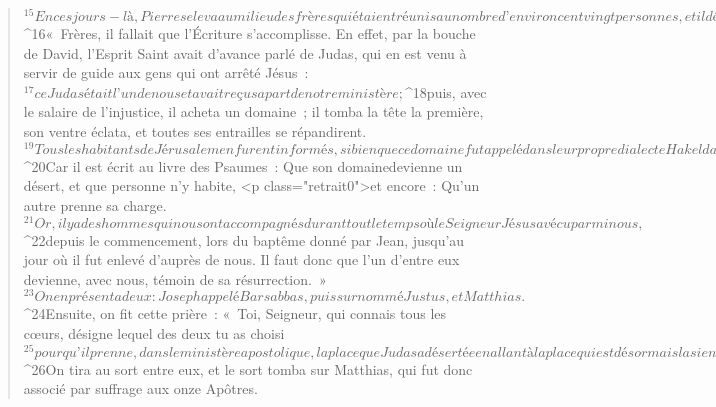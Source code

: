 \begin{verse}
${}^{15}En ces jours-là, Pierre se leva au milieu des frères qui étaient réunis au nombre d’environ cent vingt personnes, et il déclara : 
${}^{16}« Frères, il fallait que l’Écriture s’accomplisse. En effet, par la bouche de David, l’Esprit Saint avait d’avance parlé de Judas, qui en est venu à servir de guide aux gens qui ont arrêté Jésus : 
${}^{17}ce Judas était l’un de nous et avait reçu sa part de notre ministère ; 
${}^{18}puis, avec le salaire de l’injustice, il acheta un domaine ; il tomba la tête la première, son ventre éclata, et toutes ses entrailles se répandirent. 
${}^{19}Tous les habitants de Jérusalem en furent informés, si bien que ce domaine fut appelé dans leur propre dialecte Hakeldama, c’est-à-dire Domaine-du-Sang. 
${}^{20}Car il est écrit au livre des Psaumes :
      Que son domainedevienne un désert,
      et que personne n’y habite,
      <p class="retrait0">et encore :
      Qu’un autre prenne sa charge.
${}^{21}Or, il y a des hommes qui nous ont accompagnés durant tout le temps où le Seigneur Jésus a vécu parmi nous, 
${}^{22}depuis le commencement, lors du baptême donné par Jean, jusqu’au jour où il fut enlevé d’auprès de nous. Il faut donc que l’un d’entre eux devienne, avec nous, témoin de sa résurrection. » 
${}^{23}On en présenta deux : Joseph appelé Barsabbas, puis surnommé Justus, et Matthias. 
${}^{24}Ensuite, on fit cette prière : « Toi, Seigneur, qui connais tous les cœurs, désigne lequel des deux tu as choisi 
${}^{25}pour qu’il prenne, dans le ministère apostolique, la place que Judas a désertée en allant à la place qui est désormais la sienne. » 
${}^{26}On tira au sort entre eux, et le sort tomba sur Matthias, qui fut donc associé par suffrage aux onze Apôtres.
      

\end{verse}

